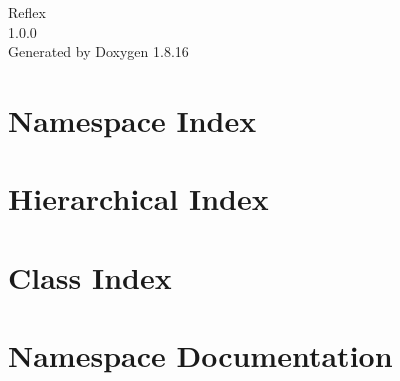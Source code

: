 \let\mypdfximage\pdfximage\def\pdfximage{\immediate\mypdfximage}\documentclass[twoside]{book}
\newcommand{\+}{\discretionary{\mbox{\scriptsize$\hookleftarrow$}}{}{}}
\newcommand{\clearemptydoublepage}{%
  \newpage{\pagestyle{empty}\cleardoublepage}%
}
\begin{document}
\hypersetup{pageanchor=false,
             bookmarksnumbered=true,
             pdfencoding=unicode
            }
\begin{titlepage}
\vspace*{7cm}
\begin{center}%
{\Large Reflex \\[1ex]\large 1.\+0.\+0 }\\
\vspace*{1cm}
{\large Generated by Doxygen 1.8.16}\\
\end{center}
\end{titlepage}
\clearemptydoublepage
{}
\tableofcontents
\clearemptydoublepage
{}
\hypersetup{pageanchor=true}

\chapter{Namespace Index}

\chapter{Hierarchical Index}

\chapter{Class Index}

\chapter{Namespace Documentation}



\end{document}
